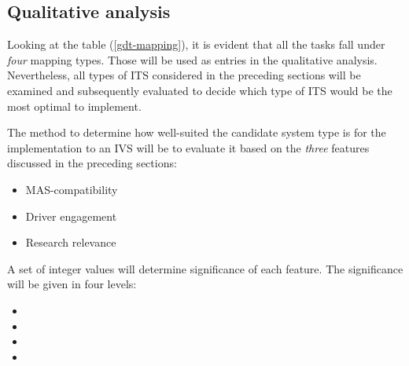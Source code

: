 \documentclass[main.tex]{subfiles}
\begin{document}



\subsection{Qualitative analysis}

Looking at the table (\ref{gdt-mapping}), it is evident that all the tasks fall under \emph{four} 
mapping types. Those will be used as entries in the qualitative analysis. Nevertheless,
all types of ITS considered in the preceding sections will be examined and subsequently
evaluated to decide which type of ITS would be the most optimal to implement. 

The method to determine how well-suited the candidate system type is for the implementation to an IVS 
will be to evaluate it based on the \emph{three} features discussed in the preceding sections: 

\begin{itemize}
    \item MAS-compatibility
    \item Driver engagement
    \item Research relevance
\end{itemize}

A set of integer values will determine significance of each feature. The significance
will be given in four levels:

\begin{itemize}
    \item {}
    \item {}
    \item {}
    \item {}
\end{itemize}
\end{document}
